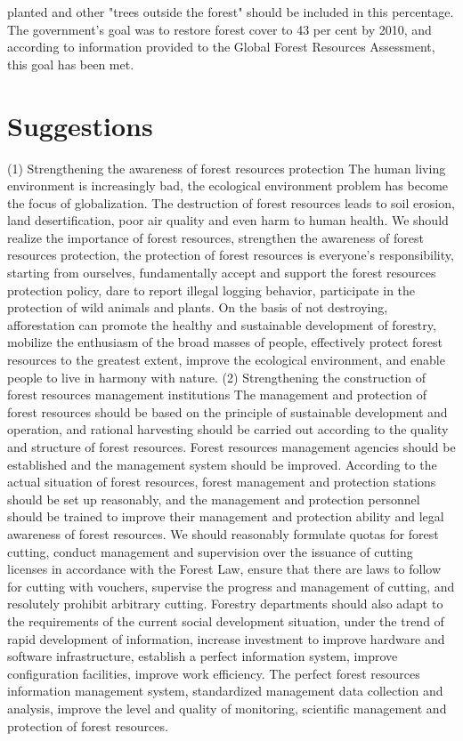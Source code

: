 \documentclass{book}\usepackage{knitr}
\begin{document}
planted and other "trees outside the forest" should be included in this percentage. The government's goal was to restore forest cover to 43 per cent by 2010, and according to information provided to the Global Forest Resources Assessment, this goal has been met.

\section{Suggestions}
(1) Strengthening the awareness of forest resources protection
The human living environment is increasingly bad, the ecological environment problem has become the focus of globalization. The destruction of forest resources leads to soil erosion, land desertification, poor air quality and even harm to human health. We should realize the importance of forest resources, strengthen the awareness of forest resources protection, the protection of forest resources is everyone's responsibility, starting from ourselves, fundamentally accept and support the forest resources protection policy, dare to report illegal logging behavior, participate in the protection of wild animals and plants. On the basis of not destroying, afforestation can promote the healthy and sustainable development of forestry, mobilize the enthusiasm of the broad masses of people, effectively protect forest resources to the greatest extent, improve the ecological environment, and enable people to live in harmony with nature.
(2) Strengthening the construction of forest resources management institutions
The management and protection of forest resources should be based on the principle of sustainable development and operation, and rational harvesting should be carried out according to the quality and structure of forest resources. Forest resources management agencies should be established and the management system should be improved. According to the actual situation of forest resources, forest management and protection stations should be set up reasonably, and the management and protection personnel should be trained to improve their management and protection ability and legal awareness of forest resources. We should reasonably formulate quotas for forest cutting, conduct management and supervision over the issuance of cutting licenses in accordance with the Forest Law, ensure that there are laws to follow for cutting with vouchers, supervise the progress and management of cutting, and resolutely prohibit arbitrary cutting. Forestry departments should also adapt to the requirements of the current social development situation, under the trend of rapid development of information, increase investment to improve hardware and software infrastructure, establish a perfect information system, improve configuration facilities, improve work efficiency. The perfect forest resources information management system, standardized management data collection and analysis, improve the level and quality of monitoring, scientific management and protection of forest resources.
\end{document}
